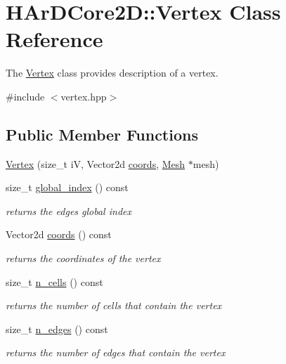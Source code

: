 \hypertarget{classHArDCore2D_1_1Vertex}{}\section{H\+Ar\+D\+Core2D\+:\+:Vertex Class Reference}
\label{classHArDCore2D_1_1Vertex}


The \hyperlink{classHArDCore2D_1_1Vertex}{Vertex} class provides description of a vertex.  




{\ttfamily \#include $<$vertex.\+hpp$>$}

\subsection*{Public Member Functions}
\begin{DoxyCompactItemize}
\item 
\hyperlink{classHArDCore2D_1_1Vertex_ab33652b8567bb0f58514262839506ec4}{Vertex} (size\+\_\+t iV, Vector2d \hyperlink{group__Mesh_gade92964c93627c034b021c1d23075a79}{coords}, \hyperlink{classHArDCore2D_1_1Mesh}{Mesh} $\ast$mesh)
\item 
size\+\_\+t \hyperlink{group__Mesh_gad19d3dca11de693ac4a454b2263eb179}{global\+\_\+index} () const
\begin{DoxyCompactList}\small\item\em returns the edges global index \end{DoxyCompactList}\item 
Vector2d \hyperlink{group__Mesh_gade92964c93627c034b021c1d23075a79}{coords} () const
\begin{DoxyCompactList}\small\item\em returns the coordinates of the vertex \end{DoxyCompactList}\item 
size\+\_\+t \hyperlink{group__Mesh_gaae4e6a646ff79f705428c9063736aee1}{n\+\_\+cells} () const
\begin{DoxyCompactList}\small\item\em returns the number of cells that contain the vertex \end{DoxyCompactList}\item 
size\+\_\+t \hyperlink{group__Mesh_ga1d6d5233c4f95c862387b5961fef5a22}{n\+\_\+edges} () const
\begin{DoxyCompactList}\small\item\em returns the number of edges that contain the vertex \end{DoxyCompactList}\item 

\end{DoxyCompactItemize}
